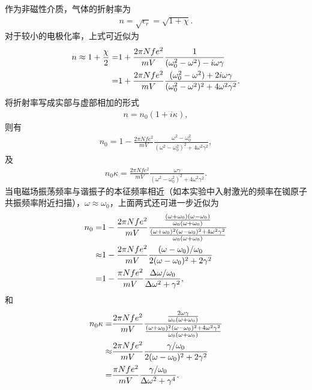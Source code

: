 \documentclass[a4paper, 10pt]{article}
\begin{document}
\begin{multicols}{2}
作为非磁性介质，气体的折射率为
\begin{align}
    n=\sqrt{\epsilon_r}=\sqrt{1+\chi}.
\end{align}
对于较小的电极化率，上式可近似为
\begin{align}
    \notag n\approx 1+\frac{\chi}{2}=&1+\frac{2\pi Nfe^2}{mV}\frac{1}{(\omega_0^2-\omega^2)-i\omega\gamma}\\
    =&1+\frac{2\pi Nfe^2}{mV}\frac{(\omega_0^2-\omega^2)+2i\omega\gamma}{(\omega_0^2-\omega^2)^2+4\omega^2\gamma^2}.
\end{align}
将折射率写成实部与虚部相加的形式
\begin{align}
    n=n_0(1+i\kappa),
\end{align}
则有
\begin{align}
    n_0=1-\frac{2\pi Nfe^2}{mV}\frac{\omega^2-\omega_0^2}{(\omega^2-\omega_0^2)^2+4\omega^2\gamma^2},
\end{align}
及
\begin{align}
    n_0\kappa=\frac{2\pi Nfe^2}{mV}\frac{\omega\gamma}{(\omega^2-\omega_0^2)^2+4\omega^2\gamma^2}.
\end{align}
当电磁场振荡频率与谐振子的本征频率相近（如本实验中入射激光的频率在铷原子共振频率附近扫描），$\omega\approx\omega_0$，上面两式还可进一步近似为
\begin{align}
    \notag n_0=&1-\frac{2\pi Nfe^2}{mV}\frac{\frac{(\omega+\omega_0)(\omega-\omega_0)}{\omega_0(\omega+\omega_0)}}{\frac{(\omega+\omega_0)^2(\omega-\omega_0)^2+4\omega^2\gamma^2}{\omega_0(\omega+\omega_0)}}\\
    \notag\approx&1-\frac{2\pi Nfe^2}{mV}\frac{(\omega-\omega_0)/\omega_0}{2(\omega-\omega_0)^2+2\gamma^2}\\
    =&1-\frac{\pi Nfe^2}{mV}\frac{\Delta\omega/\omega_0}{\Delta\omega^2+\gamma^2},
\end{align}
和
\begin{align}
    \notag n_0\kappa=&\frac{2\pi Nfe^2}{mV}\frac{\frac{2\omega\gamma}{\omega_0(\omega+\omega_0)}}{\frac{(\omega+\omega_0)^2(\omega-\omega_0)^2+4\omega^2\gamma^2}{\omega_0(\omega+\omega_0)}}\\
    \notag\approx&\frac{2\pi Nfe^2}{mV}\frac{\gamma/\omega_0}{2(\omega-\omega_0)^2+2\gamma^2}\\
    =&\frac{\pi Nfe^2}{mV}\frac{\gamma/\omega_0}{\Delta\omega^2+\gamma^4}.
\end{align}


\end{multicols}
\end{document}

